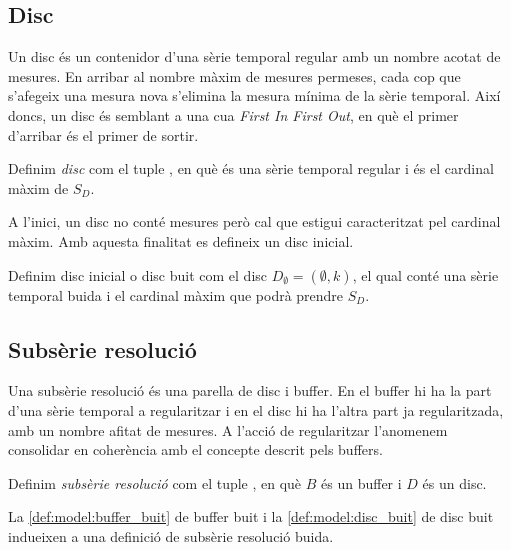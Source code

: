 \subsection{Disc}\label{sec:model:disc}


Un disc és un contenidor d'una sèrie temporal regular amb un nombre
acotat de mesures. En arribar al nombre màxim de mesures permeses,
cada cop que s'afegeix una mesura nova s'elimina la mesura mínima de
la sèrie temporal.  Així doncs, un disc és semblant a una cua
\emph{First In First Out}, en què el primer d'arribar és el
primer de sortir.

\begin{definition}[Disc]
  Definim \emph{disc} com el tuple ,
  en què  és una sèrie temporal
  regular i  és el cardinal màxim
  de $S_D$.
\end{definition}

A l'inici, un disc no conté mesures però cal que estigui caracteritzat
pel cardinal màxim. Amb aquesta finalitat es defineix un disc inicial.

\begin{definition}\label{def:model:disc_buit}
  Definim disc inicial o disc buit com el disc $D_{\emptyset} =
  (\emptyset,k)$, el qual conté una sèrie temporal buida i el cardinal
  màxim que podrà prendre $S_D$.
\end{definition}



\subsection{Subsèrie resolució}\label{sec:model:subserie-resolucio}


Una subsèrie resolució és una parella de disc i buffer. En el
buffer hi ha la part d'una sèrie temporal a regularitzar i en el disc
hi ha l'altra part ja regularitzada, amb un nombre afitat de
mesures. A l'acció de regularitzar l'anomenem consolidar en coherència
amb el concepte descrit pels buffers. 



\begin{definition}
  Definim \emph{subsèrie resolució} com el tuple
  , en què $B$ és un buffer i $D$
  és un disc.
\end{definition}
 
La \autoref{def:model:buffer_buit} de buffer buit i la
\autoref{def:model:disc_buit} de disc buit indueixen a una definició
de subsèrie resolució buida.  

